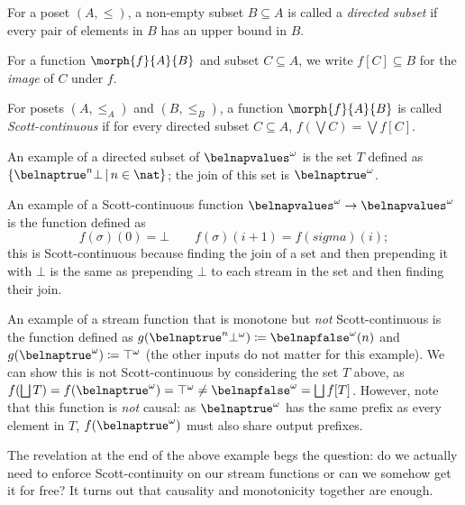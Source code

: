 \begin{definition}
    For a poset \((A, \leq)\), a non-empty subset \(B \subseteq A\) is called a
    \emph{directed subset} if every pair of elements in \(B\) has an upper bound
    in \(B\).
\end{definition}

\begin{notation}[Image]
    For a function \(\morph{f}{A}{B}\) and subset \(C \subseteq A\), we write
    \(f[C] \subseteq B\) for the \emph{image} of \(C\) under \(f\).
\end{notation}

\begin{definition}
    For posets \((A, \leq_A)\) and \((B, \leq_B)\), a function
    \(\morph{f}{A}{B}\) is called \emph{Scott-continuous} if for every directed
    subset \(C \subseteq A\), \(f(\bigvee C) = \bigvee f[C]\).
\end{definition}

\begin{example}\label{ex:directed-subsets}
    An example of a directed subset of \(\belnapvalues^\omega\) is the set \(T\)
    defined as \(\{\belnaptrue^n\bot \,|\, n \in \nat\}\); the join of this set
    is \(\belnaptrue^\omega\).

    An example of a Scott-continuous function \(
    \belnapvalues^\omega \to \belnapvalues^\omega
    \) is the function defined as \[
        f(\sigma)(0) = \bot \qquad f(\sigma)(i+1) = f(sigma)(i);
    \] this is Scott-continuous because finding the join of a set and then
    prepending it with \(\bot\) is the same as prepending \(\bot\) to each
    stream in the set and then finding their join.

    An example of a stream function that is monotone but \emph{not}
    Scott-continuous is the function defined as \(
    g(\belnaptrue^n\bot^\omega) \coloneqq \belnapfalse^\omega (n )
    \) and \(g(\belnaptrue^\omega) \coloneqq \top^\omega\) (the other inputs
    do not matter for this example).
    We can show this is not Scott-continuous by considering the set \(T\) above,
    as \(f(\bigsqcup T) = f(\belnaptrue^\omega) = \top^\omega \neq
    \belnapfalse^\omega = \bigsqcup f[T]
    \).
    However, note that this function is \emph{not} causal: as
    \(\belnaptrue^\omega\) has the same prefix as every element in \(T\),
    \(f(\belnaptrue^\omega)\) must also share output prefixes.
\end{example}

The revelation at the end of the above example begs the question: do we actually
need to enforce Scott-continuity on our stream functions or can we somehow get
it for free?
It turns out that causality and monotonicity together are enough.


